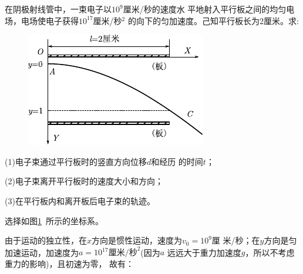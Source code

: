 \example 在阴极射线管中，一束电子以$10^9$厘米/秒的速度水
平地射入平行板之间的均匀电场，电场使电子获得$10^{17}$厘米/秒$^2$
的向下的匀加速度。己知平行板长为2厘米。求:

\begin{figure}
    \centering
    \includegraphics{figure/fig01.15}
    \caption{}
    \label{fig:01.15}
\end{figure}
(1)电子束通过平行板时的竖直方向位移$d$和经历
的时间$t$；

(2)电子束离开平行板时的速度大小和方向；

(3)在平行板内和离开板后电子束的轨迹。

\solution 选择如图\ref{fig:01.15}~所示的坐标系。

由于运动的独立性，在$x$方向是惯性运动，速度为$v_0=10^9$厘
米/秒；在$y$方向是匀加速运动，加速度为$a=10^{17}\text{厘米/秒}^2$(因为$a$
远远大于重力加速度$g$，所以不考虑重力的影响)，且初速为零，
故有：

